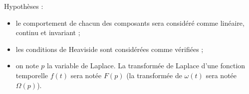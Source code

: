 %	
Hypothèses :
\begin{itemize}
\item le comportement de chacun des composants sera considéré comme linéaire, continu et invariant ;
\item les conditions de Heaviside sont considérées comme vérifiées ;
\item on note $p$ la variable de Laplace. La transformée de Laplace d'une fonction temporelle $f(t)$ sera notée $F(p)$ (la transformée de $\omega(t)$ sera notée $\Omega(p)$).
\end{itemize}

\fi

%
%
%

%
%
%


